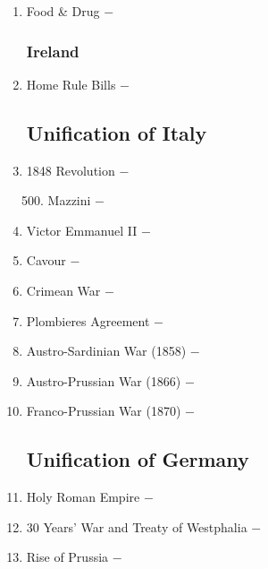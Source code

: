 \documentclass[12pt]{article}
\begin{document}
\begin{enumerate}
\item Food \& Drug $-$ 

\subsubsection{Ireland}

\item Home Rule Bills $-$ 

\subsection{Unification of Italy}

\item 1848 Revolution $-$ 

\begin{enumerate}[label=\arabic{*}.]
\setcounter{enumii}{499}

\item Mazzini $-$ 

\end{enumerate}
\setcounter{enumi}{500}

\item Victor Emmanuel II $-$

\item Cavour $-$ 

\item Crimean War $-$ 

\item Plombieres Agreement $-$ 

\item Austro-Sardinian War (1858) $-$ 

\item Austro-Prussian War (1866) $-$ 

\item Franco-Prussian War (1870) $-$ 

\subsection{Unification of Germany}

\item Holy Roman Empire $-$ 

\item 30 Years' War and Treaty of Westphalia $-$ 

\item Rise of Prussia $-$ 

\begin{enumerate}[label=\arabic{*}.]
\setcounter{enumii}{510}


\end{enumerate}
\end{enumerate}
\end{document}
